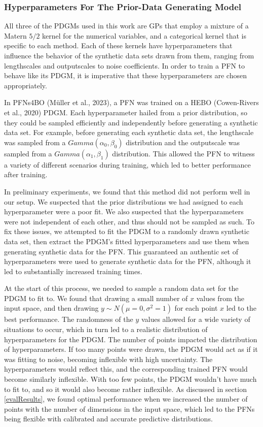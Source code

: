 \documentclass[12pt,twoside]{reedthesis}
\begin{document}
\hypertarget{hyperparameters-for-the-prior-data-generating-model}{%
\subsubsection{Hyperparameters For The Prior-Data Generating Model}\label{hyperparameters-for-the-prior-data-generating-model}}

All three of the PDGMs used in this work are GPs that employ a mixture of a Matern \(5/2\) kernel for the numerical variables, and a categorical kernel that is specific to each method. Each of these kernels have hyperparameters that influence the behavior of the synthetic data sets drawn from them, ranging from lengthscales and outputscales to noise coefficients. In order to train a PFN to behave like its PDGM, it is imperative that these hyperparameters are chosen appropriately.

In PFNs4BO (Müller et al., 2023), a PFN was trained on a HEBO (Cowen-Rivers et al., 2020) PDGM. Each hyperparameter hailed from a prior distribution, so they could be sampled efficiently and independently before generating a synthetic data set. For example, before generating each synthetic data set, the lengthscale was sampled from a \(Gamma(\alpha_0,\beta_0)\) distribution and the outputscale was sampled from a \(Gamma(\alpha_1,\beta_1)\) distribution. This allowed the PFN to witness a variety of different scenarios during training, which led to better performance after training.

In preliminary experiments, we found that this method did not perform well in our setup. We suspected that the prior distributions we had assigned to each hyperparameter were a poor fit. We also suspected that the hyperparameters were not independent of each other, and thus should not be sampled as such. To fix these issues, we attempted to fit the PDGM to a randomly drawn synthetic data set, then extract the PDGM's fitted hyperparameters and use them when generating synthetic data for the PFN. This guaranteed an authentic set of hyperparameters were used to generate synthetic data for the PFN, although it led to substantially increased training times.

At the start of this process, we needed to sample a random data set for the PDGM to fit to. We found that drawing a small number of \(x\) values from the input space, and then drawing \(y\sim N(\mu=0,\sigma^2=1)\) for each point \(x\) led to the best performance. The randomness of the \(y\) values allowed for a wide variety of situations to occur, which in turn led to a realistic distribution of hyperparameters for the PDGM. The number of points impacted the distribution of hyperparameters. If too many points were drawn, the PDGM would act as if it was fitting to noise, becoming inflexible with high uncertainty. The hyperparameters would reflect this, and the corresponding trained PFN would become similarly inflexible. With too few points, the PDGM wouldn't have much to fit to, and so it would also become rather inflexible. As discussed in section \ref{evalResults}, we found optimal performance when we increased the number of points with the number of dimensions in the input space, which led to the PFNs being flexible with calibrated and accurate predictive distributions.
\end{document}
